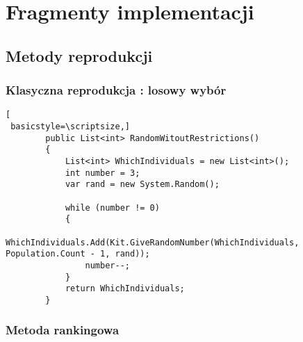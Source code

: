 \chapter{Fragmenty implementacji}\label{cha:pierwszyDokument}

\section*{Metody reprodukcji}\label{reporeprodukcji}
\subsection*{Klasyczna reprodukcja : losowy wybór}

\begin{lstlisting}[
 basicstyle=\scriptsize,]
        public List<int> RandomWitoutRestrictions()
        {
            List<int> WhichIndividuals = new List<int>();
            int number = 3;
            var rand = new System.Random();

            while (number != 0)
            {
                WhichIndividuals.Add(Kit.GiveRandomNumber(WhichIndividuals, Population.Count - 1, rand));
                number--;
            }
            return WhichIndividuals;
        }
\end{lstlisting}

\subsection*{Metoda rankingowa}

